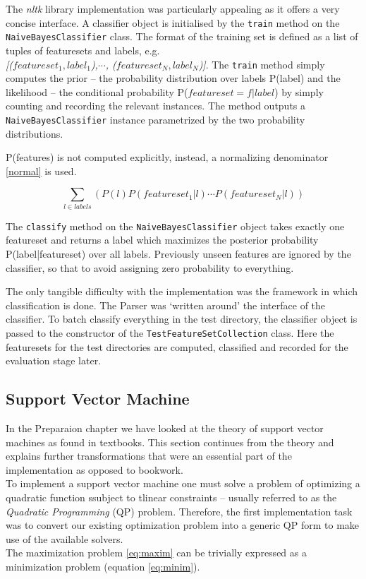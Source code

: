 \documentclass[12pt,twoside,notitlepage]{report}
\begin{document}
The \textit{nltk} library implementation was particularly appealing as it offers a very
concise interface. A classifier object is initialised by the \texttt{train}
method on the \texttt{NaiveBayesClassifier} class. The format of the training
set is defined as a list of tuples of featuresets and labels, e.g.
\\ \textit{[(\(featureset_1, label_1\)),\( \cdots\), (\(featureset_N,
label_N\))]}. 
The \texttt{train} method simply computes the prior -- the probability distribution over
labels P(label) and the likelihood -- the conditional probability
P(\(featureset=f|label\)) by simply counting and recording the relevant instances. The method
outputs a \texttt{NaiveBayesClassifier} instance parametrized by the two
probability distributions.

P(features) is not computed explicitly, instead, a normalizing denominator
\ref{normal} is used.

\begin{equation}
  \sum_{l \in labels}(P(l)P(featureset_1|l)\cdots P(featureset_N|l))
\end{equation}

The \texttt{classify} method on the \texttt{NaiveBayesClassifier} object takes
exactly one featureset and returns a label which maximizes the posterior
probability P(label|featureset) over all labels.
Previously unseen features are ignored by the classifier, so that to avoid
assigning zero probability to everything.

The only tangible difficulty with the implementation was the framework in which
classification is done. The Parser was `written around' the interface of the
classifier.
To batch classify everything in the test directory, the classifier object is
passed to the constructor of the \texttt{TestFeatureSetCollection} class. Here
the featuresets for the test directories are computed, classified and recorded
for the evaluation stage later.

\subsection{Support Vector Machine}
In the Preparaion chapter we have looked at the theory of support vector
machines as found in textbooks. This section continues from the theory and explains further
transformations that were an essential part of the implementation as opposed to
bookwork.\\
To implement a support vector machine one must solve a problem of optimizing a
quadratic function ssubject to tlinear constraints -- usually referred to as
the \textit{Quadratic Programming} (QP) problem. Therefore, the first
implementation task was to convert our existing optimization problem into a
generic QP form to make use of the available solvers.\\
The maximization problem \ref{eq:maxim} can be trivially expressed as a
minimization problem (equation \ref{eq:minim}).
\end{document}
